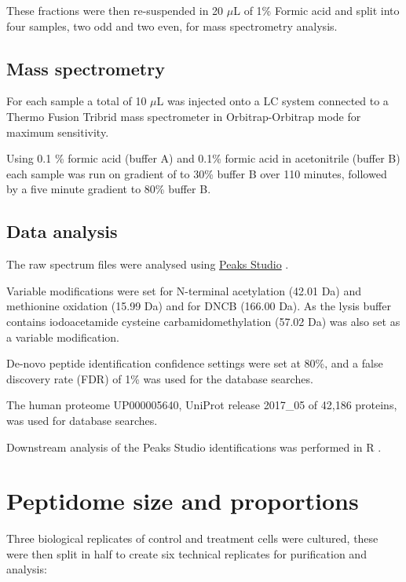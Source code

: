 \documentclass[12pt,]{book}
\begin{document}
These fractions were then re-suspended in 20 \(\mu\)L of 1\% Formic acid
and split into four samples, two odd and two even, for mass spectrometry
analysis.

\section{Mass spectrometry}\label{mass-spectrometry}

For each sample a total of 10 \(\mu\)L was injected onto a LC system
connected to a Thermo Fusion Tribrid mass spectrometer in
Orbitrap-Orbitrap mode for maximum sensitivity.

Using 0.1 \% formic acid (buffer A) and 0.1\% formic acid in
acetonitrile (buffer B) each sample was run on gradient of to 30\%
buffer B over 110 minutes, followed by a five minute gradient to 80\%
buffer B.

\section{Data analysis}\label{data-analysis}

The raw spectrum files were analysed using
\href{http://www.bioinfor.com/peaks-studio/}{Peaks Studio}
\citep{zhang2012}.

Variable modifications were set for N-terminal acetylation (42.01 Da)
and methionine oxidation (15.99 Da) and for DNCB (166.00 Da). As the
lysis buffer contains iodoacetamide cysteine carbamidomethylation (57.02
Da) was also set as a variable modification.

De-novo peptide identification confidence settings were set at 80\%, and
a false discovery rate (FDR) of 1\% was used for the database searches.

The human proteome UP000005640, UniProt release 2017\_05 of 42,186
proteins, was used for database searches.

Downstream analysis of the Peaks Studio identifications was performed in
R \citep{R-base}.

\hypertarget{peptidome-size-and-proportions}{\chapter{Peptidome size and
proportions}\label{peptidome-size-and-proportions}}

Three biological replicates of control and treatment cells were
cultured, these were then split in half to create six technical
replicates for purification and analysis:
\end{document}
